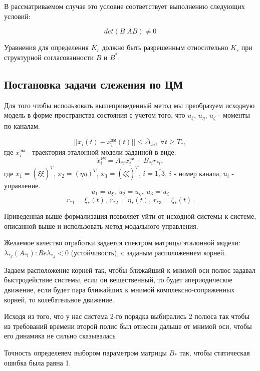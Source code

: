 В рассматриваемом случае это условие соответствует выполнению следующих условий:

\begin{equation}
\label{eq:usl_this_1}
det \left( B|AB\right) \neq 0
\end{equation}

Уравнения для определения $K_r$ должно быть разрешенным относительно $K_r$ при структурной согласованности $B$ и $B^{*}$.

\clearpage

\subsection{Постановка задачи слежения по ЦМ}
Для того чтобы использовать вышеприведенный метод мы преобразуем исходную модель в форме пространства состояния с учетом того, что $u_{\xi}$, $u_{\eta}$, $u_{\zeta}$ - моменты по каналам.

\begin{equation}
\label{eq:norm_slej}
|| x_i(t) - x_i^{\text{эм}} (t) || \leq \overline{\Delta}_{xi}, \ \forall t \geq T_{*},
\end{equation}
где $x_i^{\text{эм}}$ - траектория эталонной модели заданной в виде:
\begin{equation}
\label{eq:ur_etalon_traektor}
\Dot{x}_i^{\text{эм}} = A_{*i} x_i^{\text{эм}} + B_{*i} r_{*i},
\end{equation}
где $x_1 = (\xi \dot{\xi})^T$, $x_2 = (\eta \dot{\eta})^T$, $x_3 = (\zeta \dot{\zeta})^T$, $i = \overline{1, 3}$, $i$ - номер канала, $u_i$ - управление.
$$u_1 = u_{\xi}, \  u_2 = u_{\eta}, \ u_3 = u_{\zeta}$$
$$r_{*1} = \xi_{*} (t), \ r_{*2} = \eta_{*} (t), \ r_{*3} = \zeta_{*} (t).$$

Приведенная выше формализация позволяет уйти от исходной системы к системе, описанной выше и использовать метод модального управления. 

Желаемое качество отработки задается спектром матрицы эталонной модели: $\lambda_{*j}(A_{*i}):Re \lambda_{*j} < 0$ (устойчивость), с заданым расположением корней.

Задаем расположение корней так, чтобы ближайший к мнимой оси полюс задавал быстродействие системы, если он вещественный, то будет апериодическое движение, если будет пара ближайших к мнимой  комплексно-сопряженных корней, то колебательное движение.

Исходя из того, что у нас система 2-го порядка выбирались 2 полюса так чтобы из требований времени второй полис был отнесен дальше от мнимой оси, чтобы его динамика не сильно сказывалась

Точность определеяем выбором параметром матрицы $B_{*}$ так, чтобы статическая ошибка была равна 1.
\clearpage
